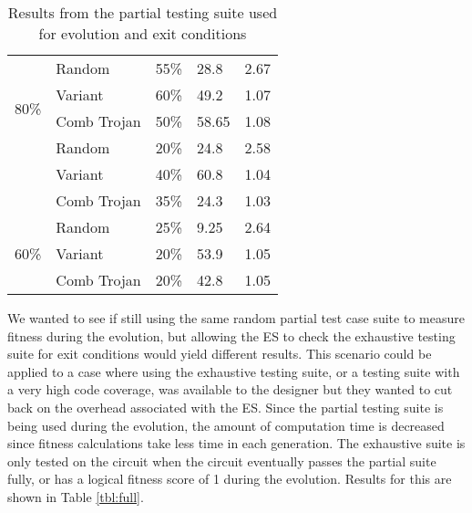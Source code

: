 \documentclass[conference]{IEEEtran}
\begin{document}
{\begin{table}
\begin{tabular}[\textwidth]{||p{0.8cm}|p{2.2cm}|p{1cm}|p{1cm}|p{1cm}||}
         \hline\hline
         \hline
         \multirow{4}{5em}{80\%} 
         & Random  & 55\% & 28.8 & 2.67 \\  
         & Variant & 60\% & 49.2 & 1.07 \\ 
         & Comb Trojan & 50\% & 58.65 & 1.08 \\
         \hline  
         \multirow{4}{5em}{70\%} 
         & Random  & 20\% & 24.8 & 2.58 \\ 
         & Variant & 40\% & 60.8 & 1.04 \\ 
         & Comb Trojan & 35\% & 24.3 & 1.03 \\ 
         \hline  
         \multirow{4}{5em}{60\%} 
         & Random  & 25\% & 9.25 & 2.64 \\  
         & Variant & 20\% & 53.9 & 1.05 \\ 
         & Comb Trojan & 20\% & 42.8 & 1.05 \\ 
         \hline  
    \end{tabular}
    \caption{Results from the partial testing suite used for evolution and exit conditions}
    \label{tbl:partial_results}
\end{table}

\par We wanted to see if still using the same random partial test case suite to measure fitness during the evolution, but allowing the ES to check the exhaustive testing suite for exit conditions would yield different results. 
This scenario could be applied to a case where using the exhaustive testing suite, or a testing suite with a very high code coverage, was available to the designer but they wanted to cut back on the overhead associated with the ES.
Since the partial testing suite is being used during the evolution, the amount of computation time is decreased since fitness calculations take less time in each generation. 
The exhaustive suite is only tested on the circuit when the circuit eventually passes the partial suite fully, or has a logical fitness score of 1 during the evolution.
Results for this are shown in Table \ref{tbl:full}.

}
\end{document}
